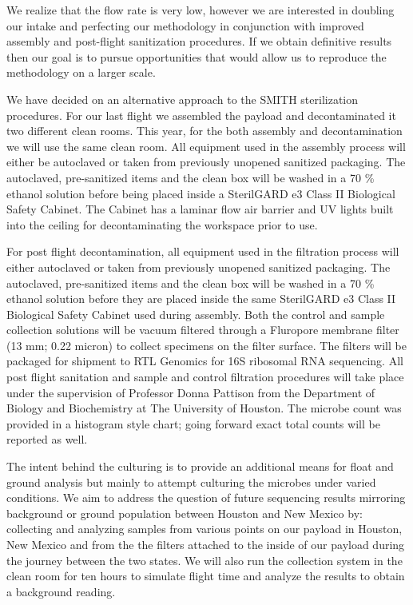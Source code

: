We realize that the flow rate is very low, however we are interested in doubling our intake and perfecting our methodology in conjunction with improved assembly and post-flight sanitization procedures. If we obtain definitive results then our goal is to pursue opportunities that would allow us to reproduce the methodology on a larger scale.

We have decided on an alternative approach to the SMITH sterilization procedures.  For our last flight we assembled the payload and decontaminated it two different clean rooms.  This year, for the both assembly and decontamination we will use the same clean room.  All equipment used in the assembly process will either be autoclaved or taken from previously unopened sanitized packaging. The autoclaved, pre-sanitized items and the clean box will be washed in a 70 \% ethanol solution before being placed inside a SterilGARD e3 Class II Biological Safety Cabinet. The Cabinet has a laminar flow air barrier and UV lights built into the ceiling for decontaminating the workspace prior to use.

For post flight decontamination, all equipment used in the filtration process will either autoclaved or taken from previously unopened sanitized packaging. The autoclaved, pre-sanitized items and the clean box will be washed in a 70 \% ethanol solution before they are placed inside the same SterilGARD e3 Class II Biological Safety Cabinet used during assembly. Both the control and sample collection solutions will be vacuum filtered through a Fluropore membrane filter (13 mm; 0.22 micron) to collect specimens on the filter surface. The filters will be packaged for shipment to RTL Genomics for 16S ribosomal RNA sequencing. All post flight sanitation and sample and control filtration procedures will take place under the supervision of Professor Donna Pattison from the Department of Biology and Biochemistry at The University of Houston.  The microbe count was provided in a histogram style chart; going forward exact total counts will be reported as well.


The intent behind the culturing is to provide an additional means for float and ground analysis but mainly to attempt culturing the microbes under varied conditions. We aim to address the question of future sequencing results mirroring background or ground population between Houston and New Mexico by: collecting and analyzing samples from various points on our payload in Houston, New Mexico and from the the filters attached to the inside of our payload during the journey between the two states. We will also run the collection system in the clean room for ten hours to simulate flight time and analyze the results to obtain a background reading.

